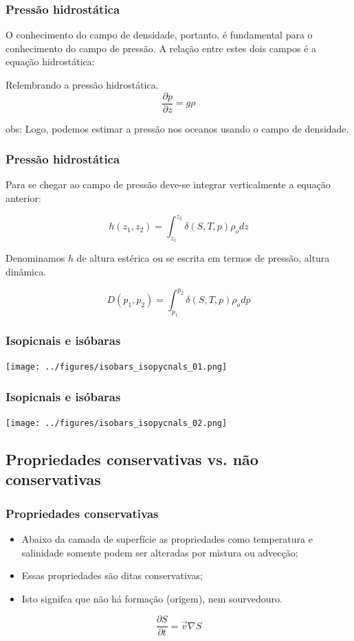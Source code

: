 \begin{frame}
\frametitle{Pressão hidrostática}
  O conhecimento do campo de densidade, portanto, é fundamental para o
  conhecimento do campo de pressão. A relação entre estes dois campos é a
  equação hidrostática:
    \begin{block}{Relembrando a pressão hidrostática.}
    $$\frac{\partial p}{\partial z} = g\rho$$
    \end{block}
    obs: Logo, podemos estimar a pressão nos oceanos usando o campo de
         densidade.
\end{frame}


\begin{frame}
\frametitle{Pressão hidrostática}
  \small{
  Para se chegar ao campo de pressão deve-se integrar verticalmente a equação
  anterior:
    \begin{block}{}
    $$h(z_1, z_2) = \int^{z_2}_{z_1}\delta(S, T, p)\rho_o dz$$
    \end{block}
    Denominamos $h$ de altura estérica ou se escrita em termos de pressão,
    altura dinâmica.
    \begin{block}{}
    $$D(p_1, p_2) = \int^{p_2}_{p_1}\delta(S, T, p)\rho_o dp$$
    \end{block}
    }
\end{frame}


\begin{frame}
\frametitle{Isopicnais e isóbaras}
    \begin{center}
        \texttt{[image: ../figures/isobars\_isopycnals\_01.png]}
    \end{center}
\end{frame}


\begin{frame}
\frametitle{Isopicnais e isóbaras}
    \begin{center}
        \texttt{[image: ../figures/isobars\_isopycnals\_02.png]}
    \end{center}
\end{frame}


\subsection{Propriedades conservativas vs. não conservativas}
\begin{frame}
\frametitle{Propriedades conservativas}
  \begin{itemize}[<+-| alert@+>]
    \item Abaixo da camada de superfície as propriedades como temperatura e
          salinidade somente podem ser alteradas por mistura ou advecção;
    \item Essas propriedades são ditas conservativas;
    \item Isto signifca que não há formação (origem), nem sourvedouro.
  \end{itemize}
    \pause
    \begin{block}{}
      $$\frac{\partial S}{\partial t} = \vec{v}\nabla{S}$$
    \end{block}
\end{frame}


